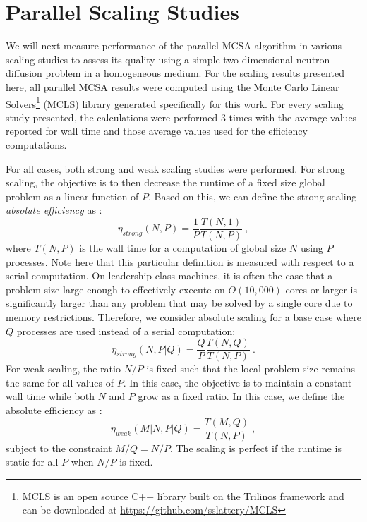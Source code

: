 \documentclass{snamc2013}
\begin{document}
\section{Parallel Scaling Studies}
We will next measure performance of the parallel MCSA algorithm in
various scaling studies to assess its quality using a simple
two-dimensional neutron diffusion problem in a homogeneous medium. For
the scaling results presented here, all parallel MCSA results were
computed using the Monte Carlo Linear Solvers\footnote{MCLS is an open
  source C++ library built on the Trilinos\cite{heroux_overview_2005}
  framework and can be downloaded at
  \url{https://github.com/sslattery/MCLS}} (MCLS) library generated
specifically for this work. For every scaling study presented, the
calculations were performed 3 times with the average values reported
for wall time and those average values used for the efficiency
computations.

For all cases, both strong and weak scaling studies were
performed. For strong scaling, the objective is to then decrease the
runtime of a fixed size global problem as a linear function of
$P$. Based on this, we can define the strong scaling \textit{absolute
  efficiency} as \cite{keyes_how_1999}:
\begin{equation}
  \eta_{strong}(N,P) = \frac{1}{P} \frac{T(N,1)}{T(N,P)}\:,
  \label{eq:strong_scaling_absolute}
\end{equation}
where $T(N,P)$ is the wall time for a computation of global size $N$
using $P$ processes. Note here that this particular definition is
measured with respect to a serial computation. On leadership class
machines, it is often the case that a problem size large enough to
effectively execute on $O(10,000)$ cores or larger is significantly
larger than any problem that may be solved by a single core due to
memory restrictions. Therefore, we consider absolute scaling for a
base case where $Q$ processes are used instead of a serial
computation:
\begin{equation}
  \eta_{strong}(N,P|Q) = \frac{Q}{P} \frac{T(N,Q)}{T(N,P)}\:.
  \label{eq:strong_scaling_absolute_ref}
\end{equation}
For weak scaling, the ratio $N/P$ is fixed such that the local problem
size remains the same for all values of $P$. In this case, the
objective is to maintain a constant wall time while both $N$ and $P$
grow as a fixed ratio. In this case, we define the absolute efficiency
as \cite{keyes_how_1999}:
\begin{equation}
  \eta_{weak}(M|N,P|Q) = \frac{T(M,Q)}{T(N,P)}\:,
  \label{eq:weak_scaling_absolute}
\end{equation}
subject to the constraint $M/Q = N/P$. The scaling is perfect if the
runtime is static for all $P$ when $N/P$ is fixed.  
\end{document}
